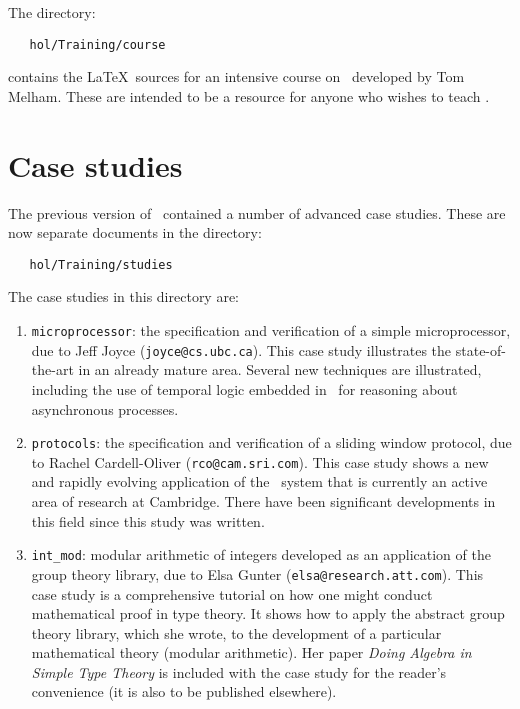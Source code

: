 The  directory:

\begin{hol}\begin{verbatim}
   hol/Training/course
\end{verbatim}\end{hol}

\noindent contains the \LaTeX\ sources for an intensive course on \HOL\
developed by Tom Melham. These are intended to be a resource for anyone who
wishes to teach \HOL.

\section*{Case studies}

The previous version of \TUTORIAL\ contained a number of advanced case
studies. These are now separate documents in the directory:

\begin{hol}\begin{verbatim}
   hol/Training/studies
\end{verbatim}\end{hol}

\noindent The case studies in this directory are:

\begin{enumerate}
\item {\tt microprocessor}:  the specification and verification of a simple
microprocessor, due to Jeff Joyce ({\verb+joyce@cs.ubc.ca+}).
This case study illustrates the
state-of-the-art in an already mature area. Several new techniques are
illustrated, including the use of temporal logic embedded in \HOL\ for
reasoning about asynchronous processes.
\item {\tt protocols}: the specification and verification of a sliding window
protocol, due to Rachel Cardell-Oliver ({\verb+rco@cam.sri.com+}).
This case study shows a new and
rapidly evolving application of the \HOL\ system that is currently an
active area of research at Cambridge. There have been significant developments
in this field since this study was written.
\item {\tt int\_mod}: modular arithmetic of integers
developed as an application of the group
theory library, due to Elsa Gunter ({\verb+elsa@research.att.com+}).
This case study
is a comprehensive
tutorial on how one might conduct mathematical proof in type theory.
It shows how to apply the abstract group theory library, which she
wrote, to the development of a particular mathematical theory (modular
arithmetic).  Her paper {\sl Doing Algebra in Simple Type Theory} is
included with the case study for the reader's convenience (it is also
to be published elsewhere).
\end{enumerate}

